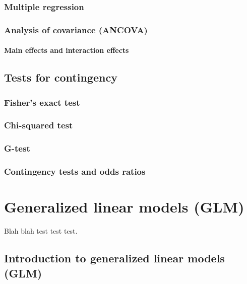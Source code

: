 \documentclass[
  13,
  letterpaper,
]{report}
\begin{document}
\section{Multiple regression}\label{sec-lin-mult}

\section{Analysis of covariance (ANCOVA)}\label{sec-lin-ancova}

\subsection{Main effects and interaction
effects}\label{sec-lin-ancova-inter}

\chapter{Tests for contingency}\label{sec-indep}

\section{Fisher's exact test}\label{sec-indep-fisher}

\section{Chi-squared test}\label{sec-indep-chisq}

\section{G-test}\label{sec-indep-gtest}

\section{Contingency tests and odds ratios}\label{sec-indep-odds}

\part{Generalized linear models (GLM)}

Blah blah test test test.

\chapter{Introduction to generalized linear models
(GLM)}\label{sec-glm1}
\end{document}
